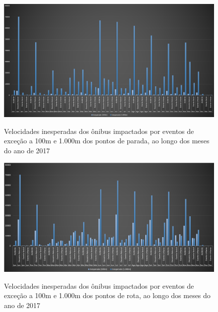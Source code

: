 \documentclass[
	12pt,				%
	oneside,			%
	a4paper,			%
	english,			%
	brazil				%
	]{abntex2ppgsi}
\begin{document}
{{\begin{figure}[!htb]
	\centering
 	  \caption{Velocidades inesperadas dos ônibus impactados por eventos de exceção a 100m e 1.000m dos pontos de parada, ao longo dos meses do ano de 2017}
		\includegraphics[width=1\linewidth]{images/apriori_analysis_stops.png}
	\label{fig:apriori_analysis_stops}
\end{figure}

\begin{figure}[!htb]
	\centering
 	  \caption{Velocidades inesperadas dos ônibus impactados por eventos de exceção a 100m e 1.000m dos pontos de rota, ao longo dos meses do ano de 2017}
		\includegraphics[width=1\linewidth]{images/apriori_analysis_shapes.png}
	\label{fig:apriori_analysis_shapes}
\end{figure}

}}
\end{document}
